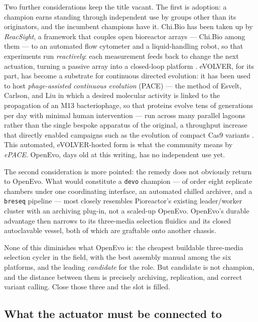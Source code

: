 \documentclass[11pt,a4paper]{article}
\newcommand{\code}[1]{\texttt{\small #1}}
\begin{document}
Two further considerations keep the title vacant. The first is adoption: a champion earns
standing through independent use by groups other than its originators, and the incumbent
champions have it. Chi.Bio has been taken up by \emph{ReacSight}, a framework that couples open
bioreactor arrays --- Chi.Bio among them --- to an automated flow cytometer and a liquid-handling
robot, so that experiments run \emph{reactively}: each measurement feeds back to change the next
actuation, turning a passive array into a closed-loop platform \cite{fribourg2022reacsight}.
eVOLVER, for its part, has become a substrate for continuous directed evolution: it has been
used to host \emph{phage-assisted continuous evolution} (PACE) --- the method of Esvelt,
Carlson, and Liu in which a desired molecular activity is linked to the propagation of an M13
bacteriophage, so that proteins evolve tens of generations per day with minimal human
intervention \cite{esvelt2011pace} --- run across many parallel lagoons rather than the single
bespoke apparatus of the original, a throughput increase that directly enabled campaigns such as
the evolution of compact Cas9 variants \cite{huang2022epace}. This automated, eVOLVER-hosted form
is what the community means by \emph{ePACE}. OpenEvo, days old at this writing, has no independent
use yet.

The second consideration is more pointed: the remedy does not obviously return to OpenEvo. What
would constitute a \texttt{devo} champion --- of order eight replicate chambers under one
coordinating interface, an automated chilled archiver, and a \code{breseq} pipeline --- most
closely resembles Pioreactor's existing leader/worker cluster with an archiving plug-in, not a
scaled-up OpenEvo. OpenEvo's durable advantage then narrows to its three-media selection fluidics
and its closed autoclavable vessel, both of which are graftable onto another chassis.

None of this diminishes what OpenEvo is: the cheapest buildable three-media selection cycler in
the field, with the best assembly manual among the six platforms, and the leading \emph{candidate}
for the role. But candidate is not champion, and the distance between them is precisely archiving,
replication, and correct variant calling. Close those three and the slot is filled.

\subsection{What the actuator must be connected to}
\label{sec:apparatus}
\end{document}
